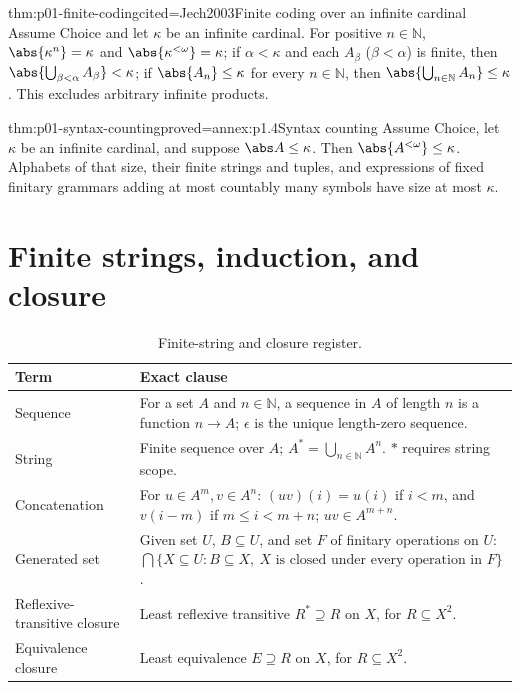 \begin{hbtheorem}{thm:p01-finite-coding}{cited=Jech2003}{Finite coding over an infinite cardinal}
Assume Choice and let \(\kappa\) be an infinite cardinal.  For positive
\(n\in\mathbb N\),
\(\abs{\kappa^n}=\kappa\) and \(\abs{\kappa^{<\omega}}=\kappa\); if
\(\alpha<\kappa\) and each \(A_\beta\) (\(\beta<\alpha\)) is finite, then
\(\abs{\bigcup_{\beta<\alpha}A_\beta}<\kappa\); if
\(\abs{A_n}\leq\kappa\) for every \(n\in\mathbb N\), then
\(\abs{\bigcup_{n\in\mathbb N}A_n}\leq\kappa\).  This excludes arbitrary
infinite products.
\end{hbtheorem}
\begin{hbcorollary}{thm:p01-syntax-counting}{proved=annex:p1.4}{Syntax counting}
Assume Choice, let \(\kappa\) be an infinite cardinal, and suppose
\(\abs A\leq\kappa\).  Then
\(\abs{A^{<\omega}}\leq\kappa\).  Alphabets of that size, their finite
strings and tuples, and expressions of fixed finitary grammars adding at most
countably many symbols have size at most \(\kappa\).
\end{hbcorollary}

\section{Finite strings, induction, and closure}
\label{sec:p01-strings-recursion}
\begingroup\small
\begin{longtable}{@{}p{}p{}@{}}
\caption{Finite-string and closure register.}\label{tab:p01-string-register}\\
\toprule Term & Exact clause \\ \midrule
Sequence\index{finite sequence} & For a set \(A\) and \(n\in\mathbb N\), a
sequence in \(A\) of length \(n\) is a function \(n\to A\);
\(\epsilon\) is the unique length-zero sequence. \\
String\index{string} & Finite sequence over \(A\);
\(A^*=\bigcup_{n\in\mathbb N}A^n\).  \(*\) requires string scope. \\
Concatenation\index{concatenation} & For \(u\in A^m,v\in A^n\):
\((uv)(i)=u(i)\) if \(i<m\), and \(v(i-m)\) if \(m\leq i<m+n\);
\(uv\in A^{m+n}\). \\
Generated set\index{inductive definition} & Given set \(U\), \(B\subseteq U\),
and set \(F\) of finitary operations on \(U\):
\(\bigcap\{X\subseteq U:B\subseteq X,\ X\text{ is closed under every
operation in }F\}\). \\
Reflexive-transitive closure\index{reflexive transitive closure} & Least
reflexive transitive \(R^*\supseteq R\) on \(X\), for \(R\subseteq X^2\). \\
Equivalence closure\index{equivalence closure} & Least equivalence
\(E\supseteq R\) on \(X\), for \(R\subseteq X^2\). \\
\bottomrule
\end{longtable}
\endgroup

